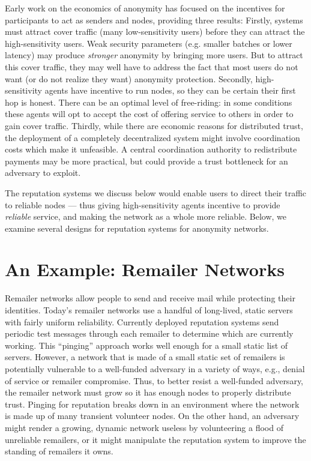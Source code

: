 \documentclass[times,10pt,twocolumn]{article}
\begin{document}
Early work on the economics of anonymity \cite{econymics} has focused on
the incentives for participants to act as senders and nodes, providing
three results: Firstly, systems must attract cover traffic (many
low-sensitivity users) before they can attract the high-sensitivity
users. Weak security parameters (e.g. smaller batches or lower latency) may produce
\emph{stronger} anonymity by bringing more users. But to attract this
cover traffic, they may well have to address the fact that most users do
not want (or do not realize they want) anonymity protection. Secondly,
high-sensitivity agents have incentive to run nodes, so they can be
certain their first hop is honest. There can be an optimal level of
free-riding: in some conditions these agents will opt to accept the cost
of offering service to others in order to gain cover traffic. Thirdly,
while there are economic reasons for distributed trust, the deployment of
a completely decentralized system might involve coordination costs which
make it unfeasible. A central coordination authority to redistribute
payments may be more practical, but could provide a trust bottleneck
for an adversary to exploit.

The reputation systems we discuss below would enable users 
to direct their traffic to reliable nodes --- thus giving
high-sensitivity agents incentive to provide {\it reliable} service, and making
the network as a whole more reliable.  Below, we examine several
designs for reputation systems for anonymity networks.

\section{An Example: Remailer Networks}

Remailer networks allow people to send and receive mail while protecting
their identities. Today's remailer networks use a handful of long-lived,
static servers with fairly uniform reliability. Currently deployed
reputation systems \cite{echolot} send periodic test messages through
each remailer to determine which are currently working. This ``pinging''
approach works well enough for a small static list of servers. However,
a network that is made of a small static set of remailers is potentially
vulnerable to a well-funded adversary in a variety of ways, e.g.,
denial of service or remailer compromise. %
Thus, to better
resist a well-funded adversary, the remailer network must grow so it has
enough nodes to properly distribute trust. Pinging for reputation breaks
down in an environment where the network is made up of many transient
volunteer nodes. On the other hand, an adversary might render a growing,
dynamic network useless by volunteering a flood of unreliable remailers,
or it might manipulate the reputation system to improve the standing of
remailers it owns.
\end{document}
